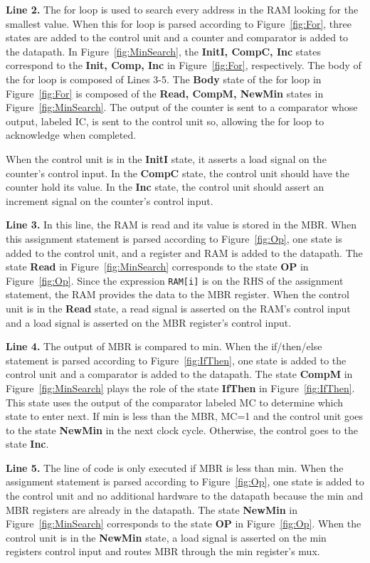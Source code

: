 {\bf Line 2.} The for loop is used to search every address in the 
RAM looking for the smallest value.  When this for loop is parsed 
according to Figure~\ref{fig:For}, three states are added to
the control unit and a counter and comparator is added to the datapath. In 
Figure~\ref{fig:MinSearch}, the {\bf InitI, CompC, Inc} states correspond 
to the {\bf Init, Comp, Inc} in Figure~\ref{fig:For}, respectively. The 
body of the for loop is composed of Lines 3-5.  The {\bf Body} state of 
the for loop in Figure~\ref{fig:For} is composed of the 
{\bf Read, CompM, NewMin} states in Figure~\ref{fig:MinSearch}.  The
output of the counter is sent to a comparator whose output, labeled
IC, is sent to the control unit so, allowing the for loop to acknowledge when
completed. 

When the control unit is in the {\bf InitI} state, it asserts a load
signal on the counter's control input.  In the {\bf CompC} state, the control unit
should have the counter hold its value.  In the {\bf Inc} state, the control
unit should assert an increment signal on the counter's control input.

{\bf Line 3.} In this line, the RAM is read and its value is stored in the MBR.  When this
assignment statement is parsed according to Figure~\ref{fig:Op}, one state is added 
to the control unit, and a register and RAM is added to the 
datapath. The state {\bf Read} in Figure~\ref{fig:MinSearch} corresponds to the state
{\bf OP} in Figure~\ref{fig:Op}.  Since the expression \verb+RAM[i]+ is on the RHS
of the assignment statement, the RAM provides the data to the 
MBR register.  When the control unit is in the {\bf Read} state, 
a read signal is asserted on the RAM's control input and a load signal is asserted 
on the MBR register's control input.

{\bf Line 4.}  The output of MBR is compared to min.  When the if/then/else statement
is parsed according to Figure~\ref{fig:IfThen}, one state is added
to the control unit and a comparator is added to the datapath.  The state {\bf CompM} in 
Figure~\ref{fig:MinSearch} plays the role of the state {\bf IfThen} in Figure~\ref{fig:IfThen}.
This state uses the output of the comparator labeled MC to determine which 
state to enter next.  If min is less than the MBR, MC=1 and the 
control unit 
goes to the state {\bf NewMin} in the next clock cycle.  Otherwise, the control goes 
to the state {\bf Inc}.

{\bf Line 5.}  The line of code is only executed if MBR is less than min.  
When the assignment statement is parsed according to Figure~\ref{fig:Op},
one state is added to the control unit and no additional hardware
to the datapath because the min and MBR registers are already in the datapath.
The state {\bf NewMin} in Figure~\ref{fig:MinSearch} corresponds to the state
{\bf OP} in Figure~\ref{fig:Op}.  When the control unit is in the {\bf NewMin}
state, a load signal is asserted on the min registers control input 
and routes MBR through the min register's mux.

